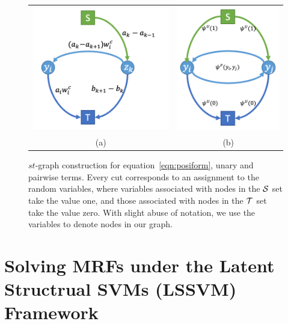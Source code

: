 \begin{figure}[t]
  \centering
  \setlength{\tabcolsep}{2pt}
  \begin{tabular}{cc}
    \includegraphics[width=0.54\columnwidth]{Part2/figures/ho.png}&
                                                                         \includegraphics[width=0.4\columnwidth]{Part2/figures/up.png}\\
                                                                         {\small (a)} & {\small (b)} 
  \end{tabular}
  \caption{\label{fig:stmincut} $st$-graph construction for
    equation~\eqref{eqn:posiform}, unary and pairwise terms.
    Every cut corresponds to an assignment to the random
    variables, where variables associated with nodes in the ${\mathcal{S}}$
    set take the value one, and those associated with nodes in
    the ${\mathcal{T}}$ set take the value zero. With slight abuse of
    notation, we use the variables to denote nodes in our graph.}
\end{figure}

\section[Solving MRFs under LSSVMs]{Solving MRFs under the Latent
  Structrual SVMs (LSSVM) Framework}
\label{sec:opt}

